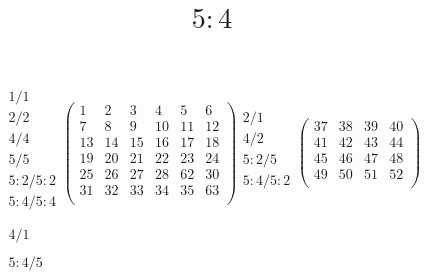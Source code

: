 \documentclass[12pt,a4paper]{amsart}
\title{$5:4$}
\begin{document}
\maketitle


\begin{align*}
\begin{array}{r}%
1/1 \\%
2/2\\%
4/4\\%
5/5\\%
5:2/5:2\\%
5:4/5:4\\%
\end{array}%
\left(\begin{array}{r|r|r|r|r|r}%
1&2&3&4&5&6\\\hline%
7&8&9&10&11&12\\\hline%
13&14&15&16&17&18\\\hline%
19&20&21&22&23&24\\\hline%
25&26&27&28&62&30\\\hline%
31&32&33&34&35&63\\%
\end{array}\right)%
\begin{array}{r}%
2/1 \\%
4/2\\%
5:2/5\\%
5:4/5:2\\%
\end{array}%
\left(\begin{array}{r|r|r|r}%
37&38&39&40\\\hline%
41&42&43&44\\\hline%
45&46&47&48\\\hline%
49&50&51&52\\%
\end{array}\right)%
\\
\begin{array}{r}%
4/1 \\%
\\%
5:4/5\\%
\\%

\end{array}
\end{align*}
\end{document}
